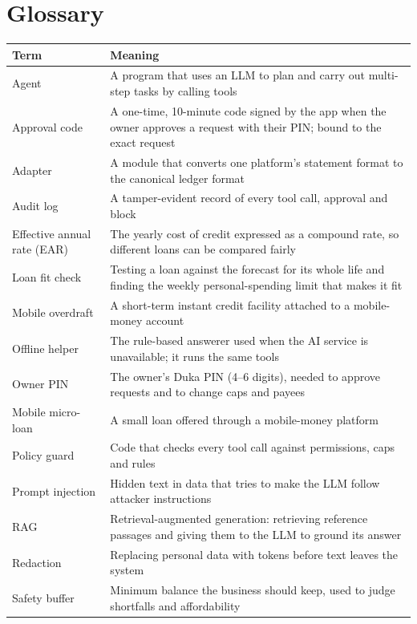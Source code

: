 \documentclass[10pt,a4paper]{article}
\begin{document}
\section{Glossary}
\begin{center}
\begin{tabularx}{\textwidth}{@{}p{3.8cm}Y@{}}
\toprule
\textbf{Term} & \textbf{Meaning}\\
\midrule
Agent & A program that uses an LLM to plan and carry out multi-step tasks by calling tools\\
Approval code & A one-time, 10-minute code signed by the app when the owner approves a request with their PIN; bound to the exact request\\
Adapter & A module that converts one platform's statement format to the canonical ledger format\\
Audit log & A tamper-evident record of every tool call, approval and block\\
Effective annual rate (EAR) & The yearly cost of credit expressed as a compound rate, so different loans can be compared fairly\\
Loan fit check & Testing a loan against the forecast for its whole life and finding the weekly personal-spending limit that makes it fit\\
Mobile overdraft & A short-term instant credit facility attached to a mobile-money account\\
Offline helper & The rule-based answerer used when the AI service is unavailable; it runs the same tools\\
Owner PIN & The owner's Duka PIN (4--6 digits), needed to approve requests and to change caps and payees\\
Mobile micro-loan & A small loan offered through a mobile-money platform\\
Policy guard & Code that checks every tool call against permissions, caps and rules\\
Prompt injection & Hidden text in data that tries to make the LLM follow attacker instructions\\
RAG & Retrieval-augmented generation: retrieving reference passages and giving them to the LLM to ground its answer\\
Redaction & Replacing personal data with tokens before text leaves the system\\
Safety buffer & Minimum balance the business should keep, used to judge shortfalls and affordability\\

\end{tabularx}
\end{center}
\end{document}
